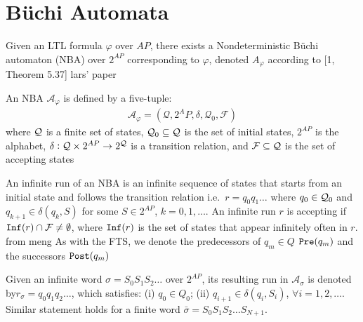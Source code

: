 \section{B\"{u}chi Automata}
Given an LTL formula $\varphi$ over $AP$, there exists a Nondeterministic B\"{u}chi automaton (NBA) over $2^{AP}$ corresponding to $\varphi$, denoted $A_\varphi$ according to [1, Theorem 5.37] lars' paper
\begin{definition}
\label{defNBA}
An NBA $\mathcal{A}_\varphi$ is defined by a five-tuple:
\begin{align*}
\mathcal{A}_\varphi = (\mathcal{Q},2^AP,\delta,\mathcal{Q}_0,\mathcal{F})
\end{align*}
where $\mathcal{Q}$ is a finite set of states, $\mathcal{Q}_0 \subseteq \mathcal{Q}$ is the set of initial states, $2^{AP}$ is the alphabet, $\delta: \mathcal{Q} \times 2^{AP} \rightarrow 2^{\mathcal{Q}}$ is a transition relation, and $\mathcal{F} \subseteq \mathcal{Q}$ is the set of accepting states
\end{definition} 
An infinite run of an NBA is an infinite sequence of states that starts from an initial state and follows the transition relation i.e.\ $r=q_0 q_1\dots$ where $q_0 \in \mathcal{Q}_0$ and $q_{k+1} \in \delta(q_k,S)$ for some $S \in 2^{AP}$, $k=0,1,\dots$. An infinite run $r$ is accepting if $\texttt{Inf} (r) \cap \mathcal{F} \neq \emptyset$, where $\texttt{Inf} (r)$ is the set of states that appear infinitely often in $r$. from meng As with the FTS, we denote the predecessors of $q_m \in Q$ $\texttt{Pre} (q_m)$ and the successors $\texttt{Post}(q_m)$ 

\begin{definition}
\label{defRR}
Given an infinite word $\sigma = S_0 S_1 S_2 \dots$ over $2^{AP}$, its resulting run in $\mathcal{A}_\sigma$ is denoted by$ r_\sigma = q_0 q_1 q_2 \dots$, which satisfies: (i) $q_0 \in Q_0$; (ii) $q_{i+1} \in \delta (q_i, S_i)$, $\forall i = 1,2, \dots$. Similar statement holds for a finite word $\bar{\sigma} = S_0 S_1 S_2 \dots S_{N+1}$.  
\end{definition}

